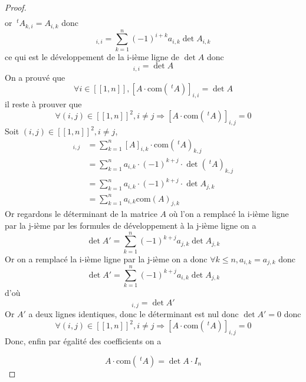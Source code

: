\documentclass[11pt,colorlinks]{book}
\theoremstyle{mytheoremstyle}
\theoremstyle{mytheoremstyle}
\theoremstyle{mytheoremstyle}
\theoremstyle{mytheoremstyle}
\theoremstyle{mytheoremstyle}
\theoremstyle{mytheoremstyle}
\theoremstyle{mytheoremstyle}
\theoremstyle{mytheoremstyle}
\theoremstyle{myproblemstyle}
\begin{document}
\begin{prop}
\begin{proof}
\begin{align*}
    \end{align*}
    or $~^tA_{k,i} = A_{i,k}$ donc
    \begin{equation*}
      [A\cdot \text{com}(~^tA)]_{i,i} = \sum_{k=1}^n (-1)^{i+k} a_{i,k} \det A_{i,k}
    \end{equation*}
    ce qui est le développement de la i-ième ligne de $\det A$ donc 
    \begin{equation*}
      [A\cdot \text{com}(~^tA)]_{i,i} = \det A
    \end{equation*}
    On a prouvé que
    \begin{equation*}
      \forall i \in [\![1,n]\!], [A\cdot \text{com}(~^tA)]_{i,i} = \det A
    \end{equation*}
    il reste à prouver que 
    \begin{equation*}
      \forall (i,j) \in [\![1,n]\!]^2, i\not=j \Rightarrow [A\cdot \text{com}(~^tA)]_{i,j} = 0
    \end{equation*}
    Soit $(i,j) \in [\![1,n]\!]^2, i\not=j$,
    \begin{align*}
      [A\cdot \text{com}(~^tA)]_{i,j} &= \sum_{k=1}^n [A]_{i,k} \cdot \text{com}(~^tA)_{k,j} \\ 
      &= \sum_{k=1}^n a_{i,k} \cdot (-1)^{k+j} \cdot \det (~^tA)_{k,j} \\ 
      &= \sum_{k=1}^n a_{i,k} \cdot (-1)^{k+j} \cdot \det A_{j,k} \\ 
      &= \sum_{k=1}^n a_{i,k} \text{com}(A)_{j,k}
    \end{align*}
    Or regardons le déterminant de la matrice $A$ où l'on a remplacé la i-ième ligne par la j-ième par les formules de développement à 
    la j-ième ligne on a
    \begin{equation*}
      \det A' = \sum_{k=1}^n (-1)^{k+j} a_{j,k} \det A_{j,k} 
    \end{equation*}
    Or on a remplacé la i-ième ligne par la j-ième on a donc $\forall k \leq n, a_{i,k} = a_{j,k}$ donc 
    \begin{equation*}
      \det A' = \sum_{k=1}^n (-1)^{k+j} a_{i,k} \det A_{j,k}
    \end{equation*}
    d'où 
    \begin{equation*}
      [A\cdot \text{com}(~^tA)]_{i,j} = \det A'
    \end{equation*}
    Or $A'$ a deux lignes identiques, donc le déterminant est nul donc $\det A' = 0$ donc 
    \begin{equation*}
      \forall (i,j) \in [\![1,n]\!]^2, i \not= j \Rightarrow [A\cdot \text{com}(~^tA)]_{i,j} = 0
    \end{equation*}
    Donc, enfin par égalité des coefficients on a

    \begin{equation*}
      A\cdot \text{com}(~^tA) = \det A \cdot I_n
    \end{equation*}
  \end{proof} 
\end{prop}
\end{document}
